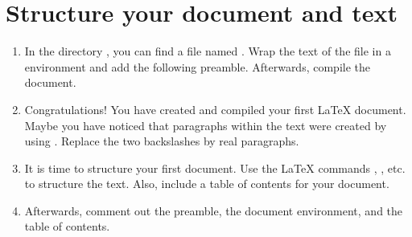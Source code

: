 \section{Structure your document and text}

\begin{enumerate}
	\item In the directory , you can find a file named . Wrap the text of the file in a  environment and add the following preamble. Afterwards, compile the document. 
	\item Congratulations! You have created and compiled your first \LaTeX{} 
	document. Maybe you have noticed that paragraphs within the text were 
	created by using . Replace the 
	two backslashes by real paragraphs.
	\item It is time to structure your first document. Use the \LaTeX{} 
	commands , 
	, etc. to structure the text. 
	Also, 
	include 
	a table of contents for your document. 
	\item Afterwards, comment out the preamble, the document environment, and the table of contents. 
\end{enumerate}
